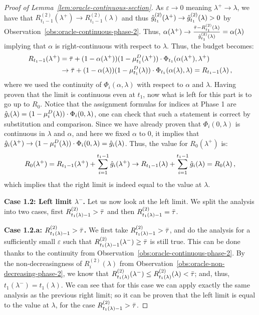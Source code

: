 \begin{proof}[Proof of Lemma~\ref{lem:oracle-continuous-section}]
    As $\varepsilon\to 0$ meaning $\lambda^+\to\lambda$, we have that $R_{{t_1}-1}^{(2)}(\lambda^+) \to R_{{t_1}-1}^{(2)}(\lambda)$ and thus $\hat{g}_{t_1}^{(2)}(\lambda^+)\to \hat{g}_{t_1}^{(2)}(\lambda)> 0$ by Observation~\ref{obs:oracle-continuous-phase-2}. Thus, $\alpha(\lambda^+) \to \frac{\bar\tau-R_{t_1}^{(2)}(\lambda)}{\hat{g}_{t_1}^{(2)}(\lambda)} = \alpha(\lambda)$ implying that $\alpha$ is right-continuous with respect to $\lambda$. Thus, the budget becomes:
    \begin{align*}
        R_{t_1-1}(\lambda^+)&=\bar\tau + (1 - \alpha(\lambda^+))(1 - \mu_{t_1}^D(\lambda^+)) \cdot \Phi_{t_1}(\alpha(\lambda^+),\lambda^+) \\
        &\to  \bar\tau + (1 - \alpha(\lambda))(1 - \mu_{t_1}^D(\lambda)) \cdot \Phi_{t_1}(\alpha(\lambda),\lambda) = R_{t_1-1}(\lambda)\,,
    \end{align*}
    where we used the continuity of $\Phi_i(\alpha,\lambda)$ with respect to $\alpha$ and $\lambda$. Having proven that the  limit is continuous even at $t_1$, now what is left for this part is to go up to $R_0$. Notice that the assignment formulas for indices at Phase 1 are $\hat{g}_i(\lambda) = (1-\mu_i^D(\lambda))\cdot \Phi_i(0,\lambda)$, one can check that such a statement is correct by substitution and comparison. Since we have already proven that $\Phi_i(0,\lambda)$ is continuous in $\lambda$ and $\alpha$, and here we fixed $\alpha$ to 0, it implies that $\hat{g}_i(\lambda^+)\to (1-\mu_i^D(\lambda))\cdot \Phi_i(0,\lambda)=\hat{g}_i(\lambda)$. Thus, the value for $R_0(\lambda^+)$ is:
    \begin{equation*}
        R_0(\lambda^+) = R_{t_1-1}(\lambda^+) + \sum_{i=1}^{t_1-1}\hat{g}_i(\lambda^+) \to R_{t_1-1}(\lambda) + \sum_{i=1}^{t_1-1}\hat{g}_i(\lambda) = R_0(\lambda)\,,
    \end{equation*}
    which implies that the right limit is indeed equal to the value at $\lambda$.

    \smallskip
    \noindent\textbf{Case 1.2: Left limit $\lambda^-$.}
    Let us now look at the left limit. We split the analysis into two cases, first $R_{t_1(\lambda)-1}^{(2)}>\bar\tau$ and then $R_{t_1(\lambda)-1}^{(2)}=\bar\tau$. 

    \smallskip
    \noindent\textbf{Case 1.2.a: $R_{t_1(\lambda)-1}^{(2)}>\bar\tau$.}
    We first take $R_{t_1(\lambda)-1}^{(2)}>\bar\tau$, and do the analysis for a sufficiently small $\varepsilon$ such that $R_{t_1(\lambda)-1}^{(2)}(\lambda^-)\geq \bar\tau$ is still true. This can be done thanks to the continuity from Observation~\ref{obs:oracle-continuous-phase-2}. 
    By the non-decreasingness of $R_i^{(2)}(\lambda)$ from Observation~\ref{obs:oracle-non-decreasing-phase-2}, we know that $R_{t_1(\lambda)}^{(2)}(\lambda^-) \leq R_{t_1(\lambda)}^{(2)}(\lambda)<\bar\tau$; and, thus, $t_1(\lambda^-)=t_1(\lambda)$. We can see that for this case we can apply exactly the same analysis as the previous right limit; so it can be proven that the left limit is equal to the value at $\lambda$, for the case $R_{t_1(\lambda)-1}^{(2)}>\bar\tau$.


\end{proof}
